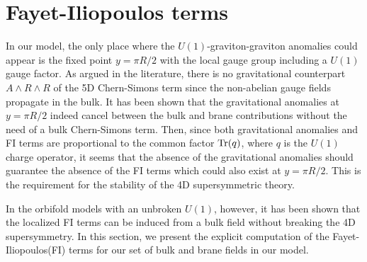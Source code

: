 \documentclass[a4paper,12pt]{article}
\begin{document}
\section{Fayet-Iliopoulos terms}

In our model, the only place where the $U(1)$-graviton-graviton anomalies 
could appear is the fixed point $y=\pi R/2$ with
the local gauge group including a $U(1)$ gauge factor. As argued 
in the literature\cite{kkl}, 
there is no gravitational counterpart $A\wedge R\wedge R$ 
of the 5D Chern-Simons term since the non-abelian gauge fields propagate 
in the bulk. It has been shown that the gravitational anomalies at $y=\pi R/2$
indeed cancel between the bulk and brane contributions without the need of
a bulk Chern-Simons term\cite{kkl}. Then, since both gravitational anomalies
and FI terms are proportional to the common factor ${\rm Tr}(q)$, 
where $q$ is the $U(1)$ charge operator, it seems that
the absence of the gravitational anomalies should guarantee
the absence of the FI terms which could also exist at $y=\pi R/2$. This is
the requirement for the stability of the 4D supersymmetric theory. 

In the orbifold models with an unbroken $U(1)$, however, it has been shown that 
the localized FI terms can be induced from a bulk field without breaking the 4D
supersymmetry\cite{scrucca,barbieri,nilles,pomarol}.
In this section, we present the explicit computation of
the Fayet-Iliopoulos(FI) terms\cite{nilles2,nilles}
for our set of bulk and brane fields in our model. 
\end{document}
